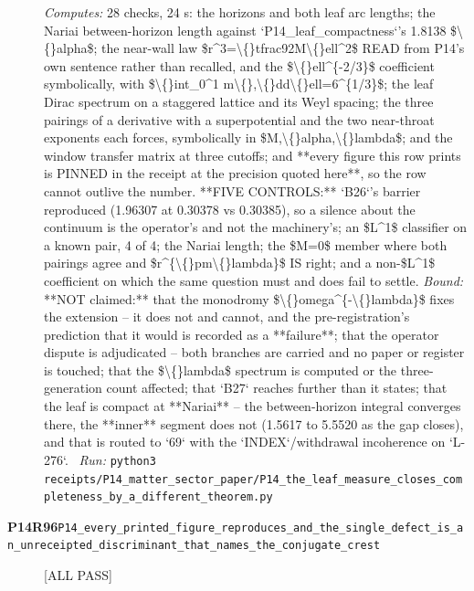 \begin{description}
\emph{Computes:} 28 checks, 24 s: the horizons and both leaf arc lengths; the Nariai between-horizon length against `P14\_leaf\_compactness`'s 1.8138 \$\textbackslash\{\}alpha\$; the near-wall law \$r\textasciicircum{}3=\textbackslash\{\}tfrac92M\textbackslash\{\}ell\textasciicircum{}2\$ READ from P14's own sentence rather than recalled, and the \$\textbackslash\{\}ell\textasciicircum{}\{-2/3\}\$ coefficient symbolically, with \$\textbackslash\{\}int\_0\textasciicircum{}1 m\textbackslash\{\},\textbackslash\{\}dd\textbackslash\{\}ell=6\textasciicircum{}\{1/3\}\$; the leaf Dirac spectrum on a staggered lattice and its Weyl spacing; the three pairings of a derivative with a superpotential and the two near-throat exponents each forces, symbolically in \$M,\textbackslash\{\}alpha,\textbackslash\{\}lambda\$; and the window transfer matrix at three cutoffs; and **every figure this row prints is PINNED in the receipt at the precision quoted here**, so the row cannot outlive the number. **FIVE CONTROLS:** `B26`'s barrier reproduced (1.96307 at 0.30378 vs 0.30385), so a silence about the continuum is the operator's and not the machinery's; an \$L\textasciicircum{}1\$ classifier on a known pair, 4 of 4; the Nariai length; the \$M=0\$ member where both pairings agree and \$r\textasciicircum{}\{\textbackslash\{\}pm\textbackslash\{\}lambda\}\$ IS right; and a non-\$L\textasciicircum{}1\$ coefficient on which the same question must and does fail to settle.
 \emph{Bound:} **NOT claimed:** that the monodromy \$\textbackslash\{\}omega\textasciicircum{}\{-\textbackslash\{\}lambda\}\$ fixes the extension -- it does not and cannot, and the pre-registration's prediction that it would is recorded as a **failure**; that the operator dispute is adjudicated -- both branches are carried and no paper or register is touched; that the \$\textbackslash\{\}lambda\$ spectrum is computed or the three-generation count affected; that `B27` reaches further than it states; that the leaf is compact at **Nariai** -- the between-horizon integral converges there, the **inner** segment does not (1.5617 to 5.5520 as the gap closes), and that is routed to `69` with the `INDEX`/withdrawal incoherence on `L-276`.
\ \emph{Run:} \texttt{python3 receipts/P14\_matter\_sector\_paper/P14\_the\_leaf\_measure\_closes\_completeness\_by\_a\_different\_theorem.py}
\item[\rcptlabel{P14_every_printed_figure_reproduces_and_the_single_defect_is_an_unreceipted_discriminant_that_names_the_conjugate_crest}{P14R96}\textbf{P14R96}\quad\texttt{P14\_every\_printed\_figure\_reproduces\_and\_the\_single\_defect\_is\_an\_unreceipted\_discriminant\_that\_names\_the\_conjugate\_crest}]\hfill\textsf{[ALL PASS]}\\

\end{description}
